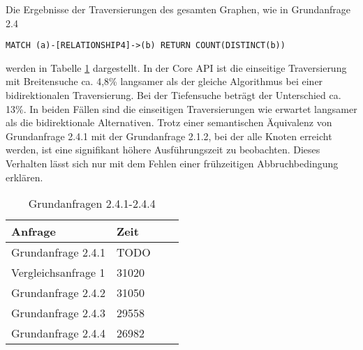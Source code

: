 \FloatBarrier
\noindent Die Ergebnisse der Traversierungen des gesamten Graphen, wie in Grundanfrage 2.4
 \begin{Verbatim}[frame=single]
MATCH (a)-[RELATIONSHIP4]->(b) RETURN COUNT(DISTINCT(b))
\end{Verbatim}
 werden in Tabelle \ref{tab:Query2_4} dargestellt.
 In der Core API ist die einseitige Traversierung mit Breitensuche ca. 4,8\% langsamer als der gleiche Algorithmus bei einer bidirektionalen Traversierung. Bei der Tiefensuche beträgt der Unterschied ca. 13\%. In beiden Fällen sind die einseitigen Traversierungen wie erwartet langsamer als die bidirektionale Alternativen. \newline
Trotz einer semantischen Äquivalenz von Grundanfrage 2.4.1 mit der Grundanfrage 2.1.2, bei der alle Knoten erreicht werden, ist eine signifikant höhere Ausführungszeit zu beobachten. Dieses Verhalten lässt sich nur mit dem Fehlen einer frühzeitigen Abbruchbedingung erklären.    
\FloatBarrier
\begin{table}[!htb]
	\centering
	\begin{tabular}{ |p{5cm}||p{3cm}|p{3cm}|p{3cm}|  }
		\hline
		Anfrage & Zeit\\
		\hline
		Grundanfrage 2.4.1 & {\color{red} TODO}\\
		\hline
		Vergleichsanfrage 1 & 31020  \\
		\hline
		Grundanfrage 2.4.2 & 31050\\
		\hline
		Grundanfrage 2.4.3 &  29558  \\
		\hline
		Grundanfrage 2.4.4 &  26982\\
		\hline
	\end{tabular}
	\caption{Grundanfragen 2.4.1-2.4.4}
	\label{tab:Query2_4}
\end{table}
\FloatBarrier

